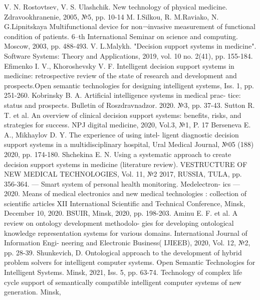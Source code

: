 \documentclass[10pt, a4paper]{article}
\begin{document}
\begin{multicols}{2}
\begin{thebibliography}{21}
\fontsize{8}{5}\selectfont
\setlength{\parindent}{0.0cm}
\setlength{\parskip}{0.0cm}
     V. N. Rostovtsev, V. S. Ulashchik. New technology of physical
medicine. Zdravookhranenie, 2005, №5, pp. 10-14
     M. I.Silkou, R. M.Raviako, N. G.Lipnitskaya Multifunctional
device for non¬invasive measurement of functional condition of
patients. 6–th International Seminar on science and computing.
Moscow, 2003, pp. 488-493.
     V. L.Malykh. "Decision support systems in medicine". Software
Systems: Theory and Applications, 2019, vol. 10 no. 2(41), pp.
155-184.
     Efimenko I. V., Khoroshevsky V. F. Intelligent decision support
systems in medicine: retrospective review of the state of research
and development and prospects.Open semantic technologies for
designing intelligent systems, Iss. 1, pp. 251-260.
     Kobrinsky B. A. Artificial intelligence systems in medical prac-
tice: status and prospects. Bulletin of Roszdravnadzor. 2020. №3,
pp. 37-43.
     Sutton R. T. et al. An overview of clinical decision support
systems: benefits, risks, and strategies for success. NPJ digital
medicine, 2020, Vol.3, №1, P. 17
    Berseneva E. A., Mikhaylov D. Y. The experience of using intel-
ligent diagnostic decision support systems in a multidisciplinary
hospital, Ural Medical Journal, №05 (188) 2020, pp. 174-180.
    Shchekina E. N. Using a systematic approach to create decision
support systems in medicine (literature review). VESTRUCTURE
OF NEW MEDICAL TECHNOLOGIES, Vol. 11, №2 2017,
RUSSIA, TULA, pp. 356-364.
     — Smart system of personal health monitoring. Medelectron-
ics — 2020. Means of medical electronics and new medical
technologies : collection of scientific articles XII International
Scientific and Technical Conference, Minsk, December 10, 2020.
BSUIR, Minsk, 2020, pp. 198-203.
     Aminu E. F. et al. A review on ontology development methodolo-
gies for developing ontological knowledge representation systems
for various domains. International Journal of Information Engi-
neering and Electronic Business( IJIEEB), 2020, Vol. 12, №2,
pp. 28-39.
    Shunkevich, D. Ontological approach to the development of
hybrid problem solvers for intelligent computer systems. Open
Semantic Technologies for Intelligent Systems. Minsk, 2021,
Iss. 5, pp. 63-74.
    Technology of complex life cycle support of semantically compatible intelligent computer systems of new generation. Minsk,

\end{thebibliography}
\end{multicols}
\end{document}
